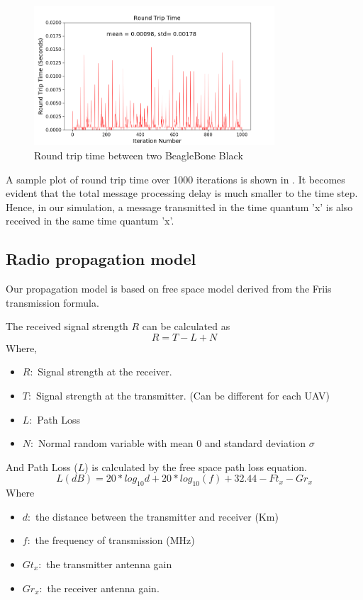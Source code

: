 \begin{figure}[hbtp]
\centering
\includegraphics[width=0.8\textwidth]{Chapter-4/figs/transmission_time}
\caption{Round trip time between two BeagleBone Black}
\label{fig:proc_delay_graph}
\end{figure}

A sample plot of round trip time over 1000 iterations is shown in . It becomes evident that the total message processing delay is much smaller to the time step. Hence, in our simulation, a message transmitted in the time quantum 'x' is also received in the same time quantum 'x'.

\subsection{Radio propagation model} \label{free_space_path_loss}
Our propagation model is based on free space model derived from the Friis transmission formula. \cite{5735774}

The received signal strength $R$ can be calculated as 
\begin{equation}
    R = T - L + N
\end{equation} 
Where,
\begin{itemize}
    \item $R : $ Signal strength at the receiver.
    \item $T : $ Signal strength at the transmitter. (Can be different for each UAV)
    \item $L : $ Path Loss
    \item $N : $ Normal random variable with mean $0$ and standard deviation $\sigma$
\end{itemize}
And Path Loss ($L$) is calculated by the free space path loss equation.
\begin{equation}
 L (dB) = 20 * log_{10} d + 20 * log_{10}(f) + 32.44 - Ft_x - Gr_x 
\end{equation}
Where
\begin{itemize}
    \item $d : $ the distance between the transmitter and receiver (Km)
	\item $f : $ the frequency of transmission (MHz)
    \item $Gt_x : $ the transmitter antenna gain 
    \item $Gr_x : $ the receiver antenna gain.
\end{itemize}

